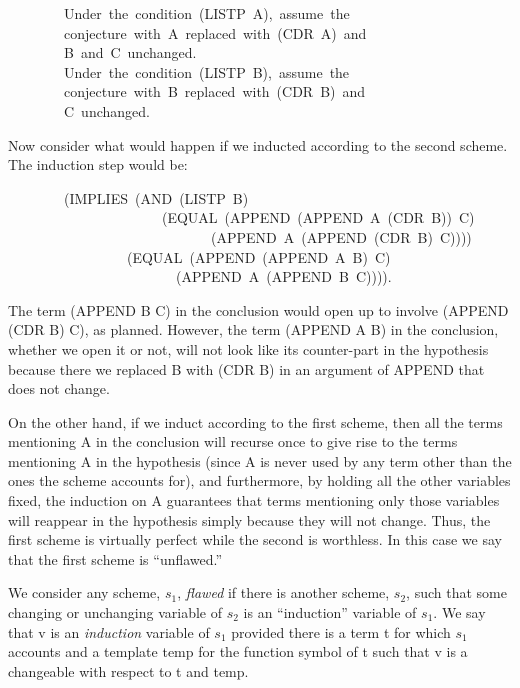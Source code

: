 \documentclass[10pt]{book}
\newenvironment{pubasis}{\begin{flushleft}}{\end{flushleft}}
\begin{document}
\begin{pubasis}
~~~~~~~~Under~the~condition~(LISTP~A),~assume~the\\
~~~~~~~~conjecture~with~A~replaced~with~(CDR~A)~and\\
~~~~~~~~B~and~C~unchanged.\\

~~~~~~~~Under~the~condition~(LISTP~B),~assume~the\\
~~~~~~~~conjecture~with~B~replaced~with~(CDR~B)~and\\
~~~~~~~~C~unchanged.\\
\end{pubasis}
Now consider what would happen if we inducted according to the second
scheme.  The induction step would be:
\begin{pubasis}
~~~~~~~~(IMPLIES~(AND~(LISTP~B)\\
~~~~~~~~~~~~~~~~~~~~~~(EQUAL~(APPEND~(APPEND~A~(CDR~B))~C)\\
~~~~~~~~~~~~~~~~~~~~~~~~~~~~~(APPEND~A~(APPEND~(CDR~B)~C))))\\
~~~~~~~~~~~~~~~~~(EQUAL~(APPEND~(APPEND~A~B)~C)\\
~~~~~~~~~~~~~~~~~~~~~~~~(APPEND~A~(APPEND~B~C)))).\\
\end{pubasis}
The term (APPEND B C) in the conclusion would open up to involve
(APPEND (CDR B) C), as planned.  However, the term (APPEND A B) in the
conclusion, whether we open it or not, will not look like its counter-part
in the hypothesis because there we replaced B with (CDR B) in an
argument of APPEND that does not change.

On the other hand, if we induct according to the first scheme,
then all the terms mentioning A in the conclusion
will recurse once to give rise to the terms mentioning A in the hypothesis
(since A is never used by any term other than the ones the scheme
accounts for), and furthermore, by holding all the other variables
fixed, the induction on A guarantees that terms mentioning only those
variables will reappear in the hypothesis simply because they will not
change.  Thus, the first scheme is virtually perfect while the
second is worthless.  In this case we say that the first scheme is ``unflawed.''

We consider any scheme, $s_{1}$, \emph{flawed} if there is another scheme, $s_{2}$,
such that some changing or unchanging variable of $s_{2}$ is an ``induction''
variable of $s_{1}$.  We say that v is an \emph{induction} variable of $s_{1}$
provided there is a term t for which $s_{1}$ accounts and a template temp
for the function symbol of t such that v is a changeable with respect to
t and temp.
\end{document}
